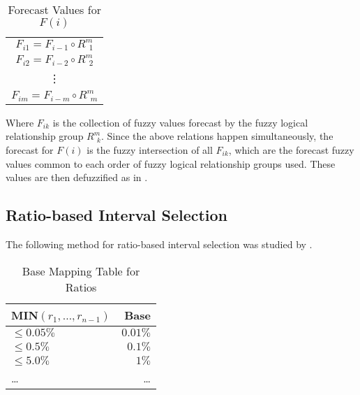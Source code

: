 \documentclass[12pt]{article}
\theoremstyle{definition}
\begin{document}
\begin{table}[H]
	\center
	\begin{tabular}{ c }
  	$F_{i1} = F_{i-1} \circ R^{m}_{\ \ 1}$ \\
  	$F_{i2} = F_{i-2} \circ R^{m}_{\ \ 2}$ \\
  	\vdots \\
  	$F_{im} = F_{i-m} \circ R^{m}_{\ \ m}$ \\
	\end{tabular}
	\caption{Forecast Values for $F(i)$}
\end{table}

Where $F_{ik}$ is the collection of fuzzy values forecast by the fuzzy logical relationship group $R^{m}_{\ \ k}$. Since the above relations happen simultaneously, the forecast for $F(i)$ is the fuzzy intersection of all $F_{ik}$, which are the forecast fuzzy values common to each order of fuzzy logical relationship groups used. These values are then defuzzified as in .

\subsection{Ratio-based Interval Selection}

The following method for ratio-based interval selection was studied by \cite{huarng2006ratio}.

\begin{table}[H]
	\center
	\begin{tabularx}{0.5\textwidth}{ X R }
  	MIN$(r_1,\ldots,r_{n-1})$ & Base\\
  	\hline 
  	\noalign{\smallskip}
	$\leq 0.05\%$ & $0.01\%$ \\
	$\leq 0.5\%$ & $0.1\%$ \\
	$\leq 5.0\%$ & $1\%$ \\
	\ldots & \ldots
	\end{tabularx}
	\caption{Base Mapping Table for Ratios}
\end{table}
\end{document}
